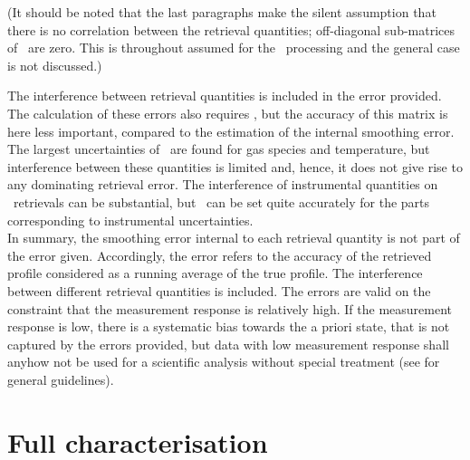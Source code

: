 (It should be noted that the last paragraphs make the silent assumption that
there is no correlation between the retrieval quantities; off-diagonal
sub-matrices of \aCvrMtr{\VctStl{\SttVct}}\ are zero. This is throughout
assumed for the \SMR\ processing and the general case is not discussed.)

The interference between retrieval quantities is included in the error
provided. The calculation of these errors also requires \aCvrMtr{\SttVct}, but
the accuracy of this matrix is here less important, compared to the estimation
of the internal smoothing error. The largest uncertainties of
\aCvrMtr{\SttVct}\ are found for gas species and temperature, but interference
between these quantities is limited and, hence, it does not give rise to any
dominating retrieval error. The interference of instrumental quantities on
\VMR\ retrievals can be substantial, but \aCvrMtr{\SttVct}\ can be
set quite accurately for the parts corresponding to instrumental uncertainties.\\

\noindent
In summary, the smoothing error internal to each retrieval quantity is not part
of the error given. Accordingly, the error refers to the accuracy of the
retrieved profile considered as a running average of the true profile. The
interference between different retrieval quantities is included. The errors are
valid on the constraint that the measurement response is relatively high. If
the measurement response is low, there is a systematic bias towards the a
priori state, that is not captured by the errors provided, but data with
low measurement response shall anyhow not be used for a scientific analysis
without special treatment (see \citet{rodgers2003intercomparison} for general
guidelines).



\section{Full characterisation}
%



